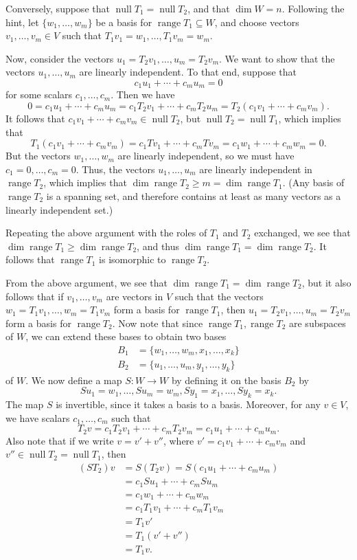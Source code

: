 \documentclass[letterpaper,12pt]{article}
\DeclareMathOperator{\nul}{null}
\DeclareMathOperator{\range}{range}
\begin{document}
\begin{enumerate}
\begin{enumerate}
Conversely, suppose that $\nul T_1 = \nul T_2$, and that $\dim W=n$. Following the hint, let $\{w_1,\ldots, w_m\}$ be a basis for $\range T_1\subseteq W$, and choose vectors $v_1,\ldots, v_m\in V$ such that $T_1v_1=w_1,\ldots, T_1v_m=w_m$.

Now, consider the vectors $u_1=T_2v_1,\ldots, u_m=T_2v_m$. We want to show that the vectors $u_1,\ldots, u_m$ are linearly independent. To that end, suppose that 
\[
 c_1u_1+\cdots + c_mu_m=0
\]
for some scalars $c_1,\ldots, c_m$. Then we have
\[
 0 = c_1u_1+\cdots +c_mu_m = c_1T_2v_1+\cdots +c_mT_2u_m = T_2(c_1v_1+\cdots+c_mv_m).
\]
It follows that $c_1v_1+\cdots +c_mv_m\in \nul T_2$, but $\nul T_2 = \nul T_1$, which implies that
\[
 T_1(c_1v_1+\cdots + c_mv_m) = c_1Tv_1+\cdots+c_mTv_m = c_1w_1+\cdots +c_mw_m=0.
\]
But the vectors $w_1,\ldots, w_m$ are linearly independent, so we must have $c_1=0,\ldots, c_m=0$. Thus, the vectors $u_1,\ldots, u_m$ are linearly independent in $\range T_2$, which implies that $\dim\range T_2\geq m = \dim\range T_1$. (Any basis of $\range T_2$ is a spanning set, and therefore contains at least as many vectors as a linearly independent set.)

Repeating the above argument with the roles of $T_1$ and $T_2$ exchanged, we see that $\dim \range T_1\geq \dim\range T_2$, and thus $\dim \range T_1 = \dim\range T_2$. It follows that $\range T_1$ is isomorphic to $\range T_2$. 

From the above argument, we see that $\dim\range T_1 = \dim \range T_2$, but it also follows that if $v_1,\ldots, v_m$ are vectors in $V$ such that the vectors $w_1=T_1v_1,\ldots, w_m=T_1v_m$ form a basis for $\range T_1$, then $u_1=T_2v_1,\ldots, u_m=T_2v_m$ form a basis for $\range T_2$. Now note that since $\range T_1,\range T_2$ are subspaces of $W$, we can extend these bases to obtain two bases
\begin{align*}
 B_1 &= \{w_1,\ldots, w_m, x_1,\ldots, x_k\}\\
 B_2 &= \{u_1,\ldots, u_m, y_1,\ldots, y_k\}
\end{align*}
of $W$. We now define a map $S:W\to W$ by defining it on the basis $B_2$ by
\[
 Su_1 = w_1, \ldots, Su_m=w_m, Sy_1=x_1,\ldots, Sy_k = x_k.
\]
The map $S$ is invertible, since it takes a basis to a basis. Moreover, for any $v\in V$, we have scalars $c_1,\ldots, c_m$ such that 
\[
 T_2v = c_1T_2v_1+\cdots + c_mT_2v_m = c_1u_1+\cdots + c_mu_m.
\]
Also note that if we write $v=v'+v''$, where $v'=c_1v_1+\cdots +c_mv_m$ and $v''\in \nul T_2=\nul T_1$, then
\begin{align*}
 (ST_2)v &= S(T_2v) = S(c_1u_1+\cdots +c_mu_m)\\
& = c_1Su_1+\cdots +c_mSu_m\\
& = c_1w_1+\cdots +c_mw_m\\
& = c_1T_1v_1+\cdots + c_mT_1v_m\\
& = T_1v'\\
& = T_1(v'+v'')\\
& = T_1v.
\end{align*}



\end{enumerate}
\end{enumerate}
\end{document}
